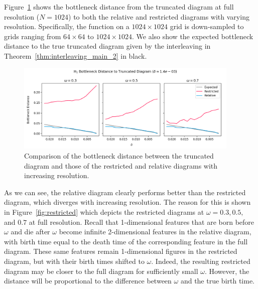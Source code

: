 Figure~\ref{fig:bottleneck} shows the bottleneck distance from the truncated diagram at full resolution ($N = 1024$) to both the relative and restricted diagrams with varying resolution.
Specifically, the function on a $1024\times 1024$ grid is down-sampled to grids ranging from $64\times 64$ to $1024\times 1024$.
We also show the expected bottleneck distance to the true truncated diagram given by the interleaving in Theorem~\ref{thm:interleaving_main_2} in black.

\begin{figure}[htbp]
  \centering
  \includegraphics[width=0.95\textwidth]{scripts/figures/matching2/bottleneck_delta.png}
  \caption{Comparison of the bottleneck distance between the truncated diagram and those of the restricted and relative diagrams with increasing resolution.}\label{fig:bottleneck}
\end{figure}

As we can see, the relative diagram clearly performs better than the restricted diagram, which diverges with increasing resolution.
The reason for this is shown in Figure~\ref{fig:restricted} which depicts the restricted diagrams at $\omega = 0.3, 0.5,$ and $0.7$ at full resolution.
Recall that 1-dimensional features that are born before $\omega$ and die after $\omega$ become infinite 2-dimensional features in the relative diagram, with birth time equal to the death time of the corresponding feature in the full diagram.
These same features remain 1-dimensional figures in the restricted diagram, but with their birth times shifted to $\omega$.
Indeed, the resulting restricted diagram may be closer to the full diagram for sufficiently small $\omega$.
However, the distance will be proportional to the difference between $\omega$ and the true birth time.

